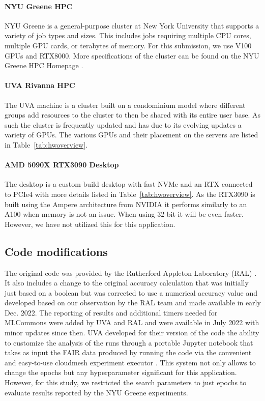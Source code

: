 \documentclass[sigplan,screen]{acmart}
\begin{document}
\paragraph{NYU Greene HPC} NYU Greene is a general-purpose cluster at New York University that supports a variety of job types and sizes. This includes jobs requiring multiple CPU cores, multiple GPU cards, or terabytes of memory. For this submission, we use V100 GPUs and RTX8000. More specifications of the cluster can be found on the NYU Greene HPC Homepage \cite{www-greene}.

\paragraph{UVA Rivanna HPC} The UVA machine is a cluster built on a condominium model where different groups add resources to the cluster to then be shared with its entire user base. As such the cluster is frequently updated and has due to its evolving updates a variety of GPUs. The various GPUs and their placement on the servers are listed in Table~\ref{tab:hwoverview}.

\paragraph{AMD 5090X RTX3090 Desktop} The desktop is a custom build desktop with fast NVMe and an RTX connected to PCIe4 with more details listed in Table~\ref{tab:hwoverview}. As the RTX3090 is built using the Ampere architecture from NVIDIA it performs similarly to an A100 when memory is not an issue. When using 32-bit it will be even faster. However, we have not utilized this for this application.


\subsection{Code modifications}
\label{sec:code}

The original code was provided by the Rutherford Appleton Laboratory (RAL) \cite{Thiyagalingam2022AIBF,github-laszewsk-mlcommons}. It also includes a change to the original accuracy calculation that was initially just based on a boolean but was corrected to use a numerical accuracy value and developed based on our observation by the RAL team and made available in early Dec. 2022. The reporting of results and additional timers needed for MLCommons were added by UVA and RAL and were available in July 2022 with minor updates since then. UVA developed for their version of the code the ability to customize the analysis of the runs through a portable Jupyter notebook that takes as input the FAIR \cite{www-fair} data produced by running the code via the convenient and easy-to-use cloudmesh experiment executor \cite{github-cloudmesh-ee,las-2023-escience-cloudmask,las-2023-ai-workflow}. This system not only allows to change the epochs but any hyperparameter significant for this application. However, for this study, we restricted the search parameters to just epochs to evaluate results reported by the NYU Greene experiments.
\end{document}
